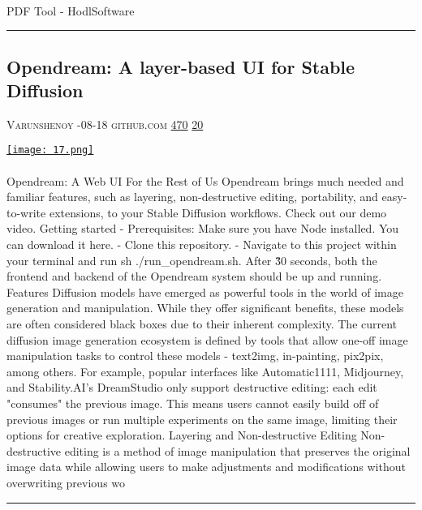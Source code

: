 \documentclass[10pt,a4paper]{article}
\begin{document}
\begin{multicols*}{2}
\paragraph{}
PDF Tool - HodlSoftware
\par\noindent\textcolor{red}{\rule{\linewidth}{0.2mm}}
\vfill
\null
\noindent\begin{minipage}{\linewidth}
\subsection{Opendream: A layer-based UI for Stable Diffusion}
\textsc{\footnotesize
{\scriptsize\faUser}\space 
Varunshenoy 
{\scriptsize\faCalendar}-08-18 
{\scriptsize\faGithub}\space 
github.com 
{\scriptsize\faThumbsOUp}\space 
\href{http://news.ycombinator.com/item?id=37136898\&utm\_term=comment}{470} 
{\scriptsize\faComments}\space 
\href{http://news.ycombinator.com/item?id=37136898\&utm\_term=comment}{20} 
}
\par\medskip\noindent
\href{https://github.com/varunshenoy/opendream?utm\_source=hackernewsletter\&utm\_medium=email\&utm\_term=show\_hn}{
    \texttt{[image: 17.png]}
}
\end{minipage}
\paragraph{}
Opendream: A Web UI For the Rest of Us  
Opendream brings much needed and familiar features, such as layering, non-destructive editing, portability, and easy-to-write extensions, to your Stable Diffusion workflows. Check out our demo video.
Getting started
- Prerequisites: Make sure you have Node installed. You can download it here.
- Clone this repository.
- Navigate to this project within your terminal and run
sh ./run\_opendream.sh. After \~30 seconds, both the frontend and backend of the Opendream system should be up and running.
Features
Diffusion models have emerged as powerful tools in the world of image generation and manipulation. While they offer significant benefits, these models are often considered black boxes due to their inherent complexity. The current diffusion image generation ecosystem is defined by tools that allow one-off image manipulation tasks to control these models - text2img, in-painting, pix2pix, among others.
For example, popular interfaces like Automatic1111, Midjourney, and Stability.AI's DreamStudio only support destructive editing: each edit "consumes" the previous image. This means users cannot easily build off of previous images or run multiple experiments on the same image, limiting their options for creative exploration.
Layering and Non-destructive Editing
Non-destructive editing is a method of image manipulation that preserves the original image data while allowing users to make adjustments and modifications without overwriting previous wo
\par\noindent\textcolor{red}{\rule{\linewidth}{0.2mm}}
\vfill
\null
\noindent\begin{minipage}{\linewidth}

\end{minipage}
\end{multicols*}
\end{document}
